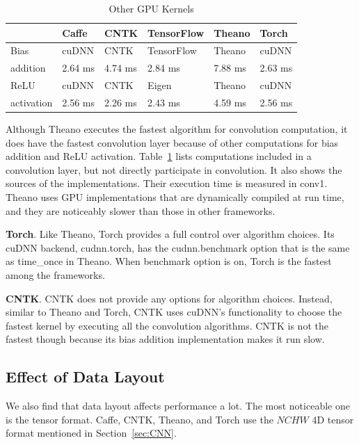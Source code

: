 \begin{table}[htbp]
\centering
\caption{Other GPU Kernels}
\label{table_misc_kernel}
\begin{scriptsize}
\begin{tabular}{|l|l|l|l|l|l|}
\hline\hline
           & Caffe    & CNTK    & TensorFlow & Theano  & Torch \\ \hline\hline
Bias       & cuDNN    & CNTK    & TensorFlow & Theano  & cuDNN \\ \cline{2-6} 
addition   & 2.64 ms  & 4.74 ms & 2.84 ms    & 7.88 ms & 2.63 ms  \\ \hline\hline
ReLU       & cuDNN    & CNTK    & Eigen      & Theano  & cuDNN \\ \cline{2-6}
activation & 2.56 ms  & 2.26 ms & 2.43 ms    & 4.59 ms & 2.56 ms  \\ \hline
\end{tabular}
\end{scriptsize}
\end{table}

Although Theano executes the fastest algorithm for convolution computation, it does have the fastest convolution layer because of other computations for bias addition and ReLU activation. Table~\ref{table_misc_kernel} lists computations included in a convolution layer, but not directly participate in convolution. It also shows the sources of the implementations. Their execution time is measured in \textsf{conv1}. Theano uses GPU implementations that are dynamically compiled at run time, and they are noticeably slower than those in other frameworks.

{\bf Torch}. Like Theano, Torch provides a full control over algorithm choices. Its cuDNN backend, cudnn.torch, has the \textsf{cudnn.benchmark} option that is the same as \textsf{time\_once} in Theano. When \textsf{benchmark} option is on, Torch is the fastest among the frameworks. 

{\bf CNTK}. CNTK does not provide any options for algorithm choices. Instead, similar to Theano and Torch, CNTK uses cuDNN's functionality to choose the fastest kernel by executing all the convolution algorithms. CNTK is not the fastest though because its bias addition implementation makes it run slow.

\subsection{Effect of Data Layout}
We also find that data layout affects performance a lot. The most noticeable one is the tensor format.
Caffe, CNTK, Theano, and Torch use the $NCHW$ 4D tensor format mentioned in Section~\ref{sec:CNN}. 

